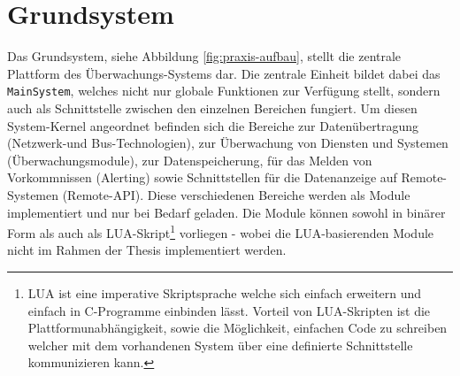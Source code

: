 \section{Grundsystem} \label{sec:praxis-basis}
Das Grundsystem, siehe Abbildung \ref{fig:praxis-aufbau}, stellt die zentrale Plattform des \"Uberwachungs-Systems dar. Die zentrale Einheit bildet dabei das \texttt{MainSystem}, welches nicht nur globale Funktionen zur Verf\"ugung stellt, sondern auch als Schnittstelle zwischen den einzelnen Bereichen fungiert. Um diesen System-Kernel angeordnet befinden sich die Bereiche zur Daten\"ubertragung (Netzwerk-und Bus-Technologien), zur \"Uberwachung von Diensten und Systemen (\"Uberwachungsmodule), zur Datenspeicherung, f\"ur das Melden von Vorkommnissen (Alerting) sowie Schnittstellen f\"ur die Datenanzeige auf Remote-Systemen (Remote-API). Diese verschiedenen Bereiche werden als Module implementiert und nur bei Bedarf geladen. Die Module k\"onnen sowohl in bin\"arer Form als auch als LUA-Skript\footnote{LUA\cite{lua} ist eine imperative Skriptsprache welche sich einfach erweitern und einfach in C-Programme einbinden l\"asst. Vorteil von LUA-Skripten ist die Plattformunabh\"angigkeit, sowie die M\"oglichkeit, einfachen Code zu schreiben welcher mit dem vorhandenen System \"uber eine definierte Schnittstelle kommunizieren kann.} vorliegen - wobei die LUA-basierenden Module nicht im Rahmen der Thesis implementiert werden.

